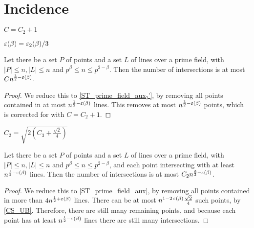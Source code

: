\chapter{Incidence}
\label{chap:inc}

\begin{definition}
    \label{ST_C}
    \leanok
    $C = C_2 + 1$
\end{definition}

\begin{definition}
    \leanok
    $\operatorname{\varepsilon}(\beta) = \operatorname{\varepsilon_2}(\beta) / 3$
\end{definition}

\begin{theorem}
    \label{ST_prime_field}
    \leanok
    Let there be a set $P$ of points and a set $L$ of lines over a prime field, 
    with $|P| \leq n, |L| \leq n$ and $p^\beta \leq n \leq p^{2 - \beta}$.
    Then the number of intersections is at most $ C n^{\frac32 - \operatorname{\varepsilon}(\beta)} $.
\end{theorem}

\begin{proof}
    \leanok
    We reduce this to \ref{ST_prime_field_aux₂'}, by removing all points contained in at most
    $n^{\frac12 - \operatorname{\varepsilon}(\beta)}$ lines. This removes at most $n^{\frac32 - \operatorname{\varepsilon}(\beta)}$
    points, which is corrected for with $C = C_2 + 1$.
\end{proof}

\begin{definition}
    \label{ST_C2}
    \leanok
    $C_2 = \sqrt{2(C_3 + \frac{\sqrt2}4)}$
\end{definition}

\begin{theorem}
    \label{ST_prime_field_aux₂'}
    \leanok
    Let there be a set $P$ of points and a set $L$ of lines over a prime field, 
    with $|P| \leq n, |L| \leq n$ and $p^\beta \leq n \leq p^{2 - \beta}$,
    and each point intersecting with at least $n^{\frac12 - \operatorname{\varepsilon}(\beta)}$ lines.
    Then the number of intersections is at most $C_2 n^{\frac32 - \operatorname{\varepsilon}(\beta)}$.
\end{theorem}

\begin{proof}
    \leanok
    We reduce this to \ref{ST_prime_field_aux}, by removing all points contained in more than 
    $4 n^{\frac12 + \operatorname{\varepsilon}(\beta)}$ lines. There can be at most
    $n^{1 - 2 \operatorname{\varepsilon}(\beta)} \frac{\sqrt2}4$ such points, by \ref{CS_UB}.
    Therefore, there are still many remaining points, and because each point has at least
    $n^{\frac12 - \operatorname{\varepsilon}(\beta)}$ lines there are still many intersections.
\end{proof}


